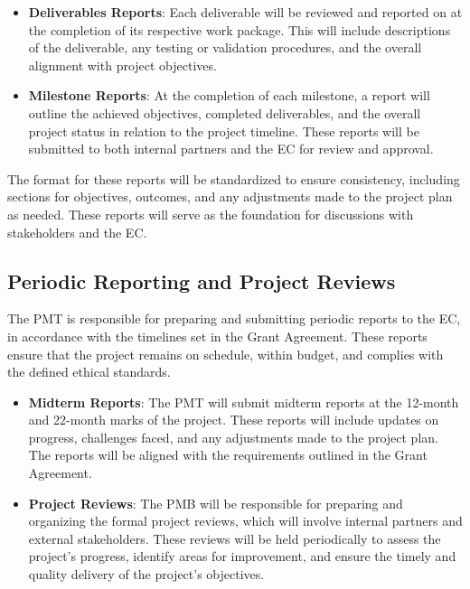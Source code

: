 \documentclass[a4paper,12pt]{article}
\begin{document}
\begin{itemize}[left=1em, itemsep=0pt, topsep=0pt] 
    \item \textbf{Deliverables Reports}: Each deliverable will be reviewed and reported on at the completion of its respective work package. This will include descriptions of the deliverable, any testing or validation procedures, and the overall alignment with project objectives. 
    \item \textbf{Milestone Reports}: At the completion of each milestone, a report will outline the achieved objectives, completed deliverables, and the overall project status in relation to the project timeline. These reports will be submitted to both internal partners and the EC for review and approval.
\end{itemize}

The format for these reports will be standardized to ensure consistency, including sections for objectives, outcomes, and any adjustments made to the project plan as needed. These reports will serve as the foundation for discussions with stakeholders and the EC.

\subsection{\textcolor{EUblue}{Periodic Reporting and Project Reviews}}

The PMT is responsible for preparing and submitting periodic reports to the EC, in accordance with the timelines set in the Grant Agreement. These reports ensure that the project remains on schedule, within budget, and complies with the defined ethical standards.

\begin{itemize}[left=1em, itemsep=0pt, topsep=0pt]
    \item \textbf{Midterm Reports}: The PMT will submit midterm reports at the 12-month and 22-month marks of the project. These reports will include updates on progress, challenges faced, and any adjustments made to the project plan. The reports will be aligned with the requirements outlined in the Grant Agreement.
    \item \textbf{Project Reviews}: The PMB will be responsible for preparing and organizing the formal project reviews, which will involve internal partners and external stakeholders. These reviews will be held periodically to assess the project’s progress, identify areas for improvement, and ensure the timely and quality delivery of the project’s objectives.
\end{itemize}
\end{document}

